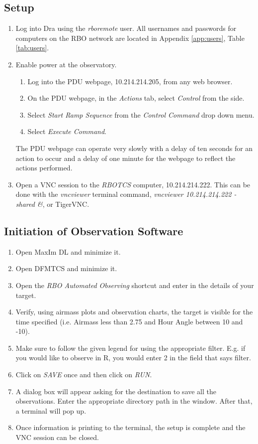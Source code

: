 \documentclass[letterpaper,12pt]{article}
\begin{document}
	\subsection{Setup}
	\begin{enumerate}
		\item Log into Dra using the \textit{rboremote} user. All usernames and passwords for computers on the RBO network are located in Appendix \ref{app:users}, Table \ref{tab:users}.
		\item Enable power at the observatory.
		\begin{enumerate}
			\item Log into the PDU webpage, 10.214.214.205, from any web browser.
			\item On the PDU webpage, in the \textit{Actions} tab, select \textit{Control} from the side.
			\item Select \textit{Start Ramp Sequence} from the \textit{Control Command} drop down menu.
			\item Select \textit{Execute Command}.
		\end{enumerate}
		The PDU webpage can operate very slowly with a delay of ten seconds for an action to occur and a delay of one minute for the webpage to reflect the actions performed.
		\item Open a VNC session to the \textit{RBOTCS} computer, 10.214.214.222. This can be done with the \textit{vncviewer} terminal command, \textit{vncviewer 10.214.214.222 -shared \&}, or TigerVNC.
	\end{enumerate}

	\subsection{Initiation of Observation Software}
	\begin{enumerate}
		\item Open MaxIm DL and minimize it.
		\item Open DFMTCS and minimize it.
		\item Open the \textit{RBO Automated Observing} shortcut and enter in the details of your target.
		\item Verify, using airmass plots and observation charts, the target is visible for the time specified (i.e. Airmass less than 2.75 and Hour Angle between 10 and -10).
		\item Make sure to follow the given legend for using the appropriate filter. E.g. if you would like to observe in R, you would enter 2 in the field that says filter.
		\item Click on \textit{SAVE} once and then click on \textit{RUN}.
		\item A dialog box will appear asking for the destination to save all the observations. Enter the appropriate directory path in the window. After that, a terminal will pop up.
		\item Once information is printing to the terminal, the setup is complete and the VNC session can be closed.
	\end{enumerate}
\newpage
\end{document}
